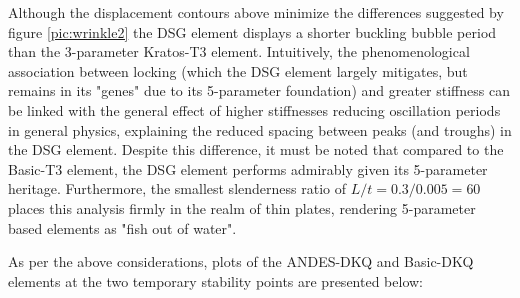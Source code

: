 Although the displacement contours above minimize the differences suggested by figure \ref{pic:wrinkle2} the DSG element displays a shorter buckling bubble period than the 3-parameter Kratos-T3 element. Intuitively, the phenomenological association between locking (which the DSG element largely mitigates, but remains in its "genes" due to its 5-parameter foundation) and greater stiffness can be linked with the general effect of higher stiffnesses reducing oscillation periods in general physics, explaining the reduced spacing between peaks (and troughs) in the DSG element. Despite this difference, it must be noted that compared to the Basic-T3 element, the DSG element performs admirably given its 5-parameter heritage. Furthermore, the smallest slenderness ratio of $L/t = 0.3/0.005 = 60$ places this analysis firmly in the realm of thin plates, rendering 5-parameter based elements as "fish out of water".

As per the above considerations, plots of the ANDES-DKQ and Basic-DKQ elements at the two temporary stability points are presented below:

